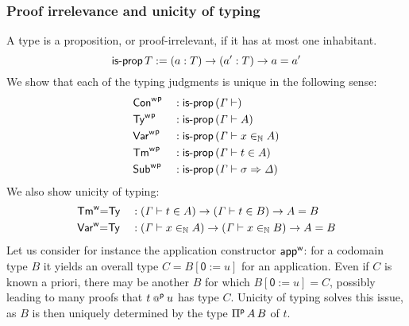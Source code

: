 \subsubsection{Proof irrelevance and unicity of typing}
\label{ss:uniq-typing-types}
A type is a proposition, or proof-irrelevant, if it has at most one inhabitant.
  \[
    \mathsf{is\text{-}prop}\,T := (a : T) \rightarrow (a' : T) \rightarrow a = a'
  \]
We show that each of the typing judgments is unique in the
following sense:
\begin{alignat*}{5}
 & {{\mathsf{Con}}^{\mathsf{w}}}^{\mathsf{p}} && : \mathsf{is\text{-}prop}\, (\mathit{\Gamma}\vdash) \\
 & {{\mathsf{Ty}}^{\mathsf{w}}}^{\mathsf{p}} && : \mathsf{is\text{-}prop}\, (\mathit{\Gamma}\vdash A) \\
 & {{\mathsf{Var}}^{\mathsf{w}}}^{\mathsf{p}} && : \mathsf{is\text{-}prop}\, (\mathit{\Gamma}\vdash x \in_{\mathbb{N}} A) \\
 & {{\mathsf{Tm}}^{\mathsf{w}}}^{\mathsf{p}} && : \mathsf{is\text{-}prop}\, (\mathit{\Gamma}\vdash t \in A) \\
 & {{\mathsf{Sub}}^{\mathsf{w}}}^{\mathsf{p}} && : \mathsf{is\text{-}prop}\, (\mathit{\Gamma}\vdash \sigma \Rightarrow \mathit{\Delta})
\end{alignat*}
We also show unicity of typing:
\begin{alignat*}{5}
  &
  {\mathsf{Tm}}^{\mathsf{w}}{=}\mathsf{Ty} & &:
  (\mathit{\Gamma} \vdash t \in A) \rightarrow
  (\mathit{\Gamma} \vdash t \in B) \rightarrow A = B
  \\
  &
  {\mathsf{Var}}^{\mathsf{w}}{=}\mathsf{Ty} & &:
  (\mathit{\Gamma} \vdash x \in_{\mathbb{N}} A) \rightarrow
  (\mathit{\Gamma} \vdash x \in_{\mathbb{N}} B) \rightarrow A = B
  \end{alignat*}
Let us consider for instance the application constructor ${\mathsf{app}}^{\mathsf{w}}$: for a codomain
type $B$ it yields an overall type $C=B[\mathsf{0} := u]$ for an application. Even
if $C$ is known a priori, there may be another $B$ for which $B[\mathsf{0} := u] = C$,
possibly leading to many proofs that $t\mathbin{{{\scriptstyle @}}^{\mathsf{p}}} u$ has type $C$. Unicity of typing
solves this issue, as $B$ is then uniquely determined by the type ${\Pi}^{\mathsf{p}}\,A\,B$
of $t$.




